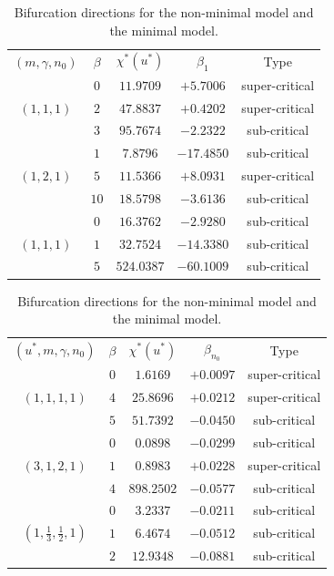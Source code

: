 \documentclass[11pt]{article} %
\theoremstyle{remark}
\theoremstyle{remark}
\numberwithin{equation}{section}
\numberwithin{figure}{section}
\numberwithin{table}{section}
\begin{document}
\begin{table}[htpb]
  \centering
  \caption{Bifurcation directions for the non-minimal model and the minimal
  model.}
  \label{Tb:bifurcation-directions}
  \renewcommand{\arraystretch}{1.15}
  \setlength{\tabcolsep}{3pt}
  \scriptsize
  \begin{tabular}{|c|c|c|c|c|}
    \hline
    \rowcolor{TableRowGray}
    \multicolumn{5}{|c|}{\textbf{Non-minimal model}} \\ \hline
    \rowcolor{TableRowGray}
    $(m,\gamma,n_0)$ & $\beta$ & $\chi^*(u^*)$ & $\beta_1$  & Type \\ \hline
    \multirow{3}{*}{$(1, 1, 1)$}
    & $0$     & $11.9709$     & $+5.7006$  & super-critical \\
    & $2$     & $47.8837$     & $+0.4202$  & super-critical \\
    & $3$     & $95.7674$     & $-2.2322$  & sub-critical   \\ \hline
    \multirow{3}{*}{$(1, 2, 1)$}
    & $1$     & $7.8796$      & $-17.4850$ & sub-critical   \\
    & $5$     & $11.5366$     & $+8.0931$  & super-critical \\
    & $10$    & $18.5798$     & $-3.6136$  & sub-critical   \\ \hline
    \multirow{3}{*}{$(1, 1, 1)$}
    & $0$     & $16.3762$     & $-2.9280$  & sub-critical   \\
    & $1$     & $32.7524$     & $-14.3380$ & sub-critical   \\
    & $5$     & $524.0387$    & $-60.1009$ & sub-critical   \\ \hline
  \end{tabular}\hspace{1em}
  \begin{tabular}{|c|c|c|c|c|}
    \hline
    \rowcolor{TableRowGray}
    \multicolumn{5}{|c|}{\textbf{Minimal model}} \\ \hline
    \rowcolor{TableRowGray}
    $(u^*,m,\gamma,n_0)$ & $\beta$ & $\chi^*(u^*)$ & $\beta_{n_0}$ & Type \\ \hline
    \multirow{3}{*}{$(1, 1, 1, 1)$}
    & $0$     & $1.6169$      & $+0.0097$     & super-critical \\
    & $4$     & $25.8696$     & $+0.0212$     & super-critical \\
    & $5$     & $51.7392$     & $-0.0450$     & sub-critical   \\ \hline
    \multirow{3}{*}{$(3, 1, 2, 1)$}
    & $0$     & $0.0898$      & $-0.0299$     & sub-critical   \\
    & $1$     & $0.8983$      & $+0.0228$     & super-critical \\
    & $4$     & $898.2502$    & $-0.0577$     & sub-critical   \\ \hline
    \multirow{3}{*}{$(1, \tfrac13, \tfrac12, 1)$}
    & $0$     & $3.2337$      & $-0.0211$     & sub-critical   \\
    & $1$     & $6.4674$      & $-0.0512$     & sub-critical   \\
    & $2$     & $12.9348$     & $-0.0881$     & sub-critical   \\ \hline
  \end{tabular}
\end{table}
\end{document}
